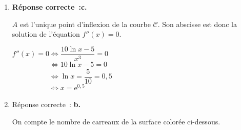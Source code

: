 \begin{corrige}
\begin{enumerate}
\begin{itemize}
               On vérifie sur le graphique que c'est bien le cas.
               \item
               \textbf{\`A partir de la formule~:}
               \par
               La fonction $f'$ est croissante sur l'intervalle $[2~;~5]$ si et seulement si sa fonction dérivée $f''$ est positive ou nulle sur cet intervalle.
               \par
               Or pour $x \geqslant 2$~:
               \par
               $x \geqslant 2 \Leftrightarrow \ln x \geqslant \ln 2$ (car la fonction $\ln$ est croissante sur $]0~;~+oo[$)\\
               $\phantom{x \geqslant 2} \Leftrightarrow 10\ln x \geqslant 10\ln 2$\\
               $\phantom{x \geqslant 2} \Leftrightarrow 10\ln x-5 \geqslant 10\ln 2-5 $\\
               \par
               Or,  $10\ln 2-5 ~=1,9$ est positif donc le numérateur de $f''$ est positif sur l'intervalle $[2~;~5]$. Comme son dénominateur est également strictement positif sur cet intervalle, $f''$ est positive sur $[2~;~5]$.
               \par
               La fonction $f'$ est donc croissante sur l'intervalle $[2~;~5]$.
          \end{itemize}
          \item
          \textbf{Réponse correcte~:\quad c.}
          \par
          $A$ est l'unique point d'inflexion de la courbe $\mathscr{C}$. Son abscisse est donc la solution de l'équation $f''(x)=0$.
          \par
          $f''(x)=0 \Leftrightarrow  \dfrac{10\ln x - 5}{x^3}=0$\\
          $\phantom{f''(x)=0} \Leftrightarrow 10\ln x - 5=0$\\
          $\phantom{f''(x)=0} \Leftrightarrow \ln x =\dfrac{5}{10}=0,5$\\
          $\phantom{f''(x)=0} \Leftrightarrow x =\text{e}^{0,5}$\\
          \item
          Réponse correcte~:\quad\textbf{ b.}
          \par
          On compte le nombre de carreaux de la surface colorée ci-dessous.
          \begin{center}
               \begin{extern}%

\end{extern}
\end{center}
\end{enumerate}
\end{corrige}

